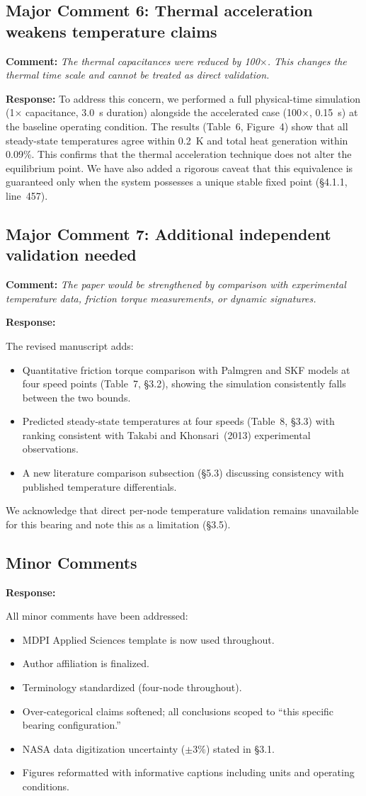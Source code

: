\documentclass[11pt]{article}
\newcommand{\reviewer}[1]{\subsection*{#1}}
\newcommand{\comment}[1]{\textbf{Comment:} \textit{#1}\par\medskip}
\newcommand{\response}[1]{\textbf{Response:} \textcolor{response}{#1}\par\bigskip}
\begin{document}
\reviewer{Major Comment 6: Thermal acceleration weakens temperature claims}

\comment{The thermal capacitances were reduced by 100$\times$. This changes the thermal time scale and cannot be treated as direct validation.}

\response{To address this concern, we performed a full physical-time simulation (1$\times$ capacitance, 3.0~s duration) alongside the accelerated case (100$\times$, 0.15~s) at the baseline operating condition. The results (Table~6, Figure~4) show that all steady-state temperatures agree within 0.2~K and total heat generation within 0.09\%. This confirms that the thermal acceleration technique does not alter the equilibrium point. We have also added a rigorous caveat that this equivalence is guaranteed only when the system possesses a unique stable fixed point (\S4.1.1, line~457).}


\reviewer{Major Comment 7: Additional independent validation needed}

\comment{The paper would be strengthened by comparison with experimental temperature data, friction torque measurements, or dynamic signatures.}

\response{The revised manuscript adds:
\begin{itemize}[nosep]
    \item Quantitative friction torque comparison with Palmgren and SKF models at four speed points (Table~7, \S3.2), showing the simulation consistently falls between the two bounds.
    \item Predicted steady-state temperatures at four speeds (Table~8, \S3.3) with ranking consistent with Takabi and Khonsari~(2013) experimental observations.
    \item A new literature comparison subsection (\S5.3) discussing consistency with published temperature differentials.
\end{itemize}
We acknowledge that direct per-node temperature validation remains unavailable for this bearing and note this as a limitation (\S3.5).}


\reviewer{Minor Comments}

\response{All minor comments have been addressed:
\begin{itemize}[nosep]
    \item MDPI Applied Sciences template is now used throughout.
    \item Author affiliation is finalized.
    \item Terminology standardized (four-node throughout).
    \item Over-categorical claims softened; all conclusions scoped to ``this specific bearing configuration.''
    \item NASA data digitization uncertainty ($\pm 3\%$) stated in \S3.1.
    \item Figures reformatted with informative captions including units and operating conditions.
\end{itemize}}
\end{document}
